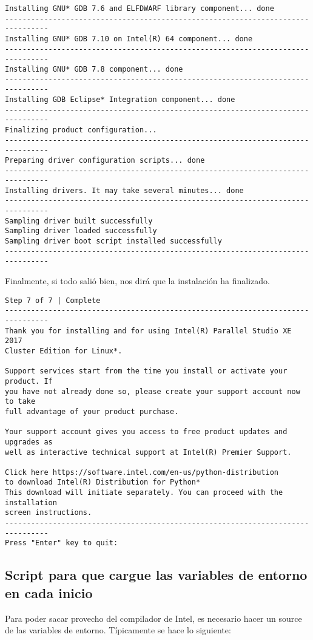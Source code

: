 \begin{lstlisting}
Installing GNU* GDB 7.6 and ELFDWARF library component... done
--------------------------------------------------------------------------------
Installing GNU* GDB 7.10 on Intel(R) 64 component... done
--------------------------------------------------------------------------------
Installing GNU* GDB 7.8 component... done
--------------------------------------------------------------------------------
Installing GDB Eclipse* Integration component... done
--------------------------------------------------------------------------------
Finalizing product configuration...
--------------------------------------------------------------------------------
Preparing driver configuration scripts... done
--------------------------------------------------------------------------------
Installing drivers. It may take several minutes... done
--------------------------------------------------------------------------------
Sampling driver built successfully
Sampling driver loaded successfully
Sampling driver boot script installed successfully
--------------------------------------------------------------------------------

\end{lstlisting}

Finalmente, si todo salió bien, nos dirá que la instalación ha finalizado.

\begin{lstlisting}
Step 7 of 7 | Complete
--------------------------------------------------------------------------------
Thank you for installing and for using Intel(R) Parallel Studio XE 2017
Cluster Edition for Linux*.

Support services start from the time you install or activate your product. If 
you have not already done so, please create your support account now to take 
full advantage of your product purchase.

Your support account gives you access to free product updates and upgrades as 
well as interactive technical support at Intel(R) Premier Support.

Click here https://software.intel.com/en-us/python-distribution 
to download Intel(R) Distribution for Python*
This download will initiate separately. You can proceed with the installation
screen instructions.
--------------------------------------------------------------------------------
Press "Enter" key to quit: 
\end{lstlisting}

\subsection{Script para que cargue las variables de entorno en cada inicio}
Para poder sacar provecho del compilador de Intel, es necesario hacer un source de las variables de entorno. Típicamente se hace lo siguiente:

